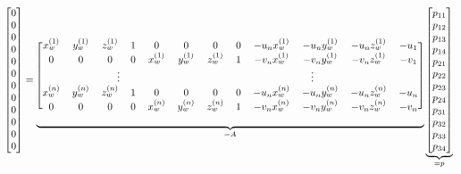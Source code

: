 \setcounter{MaxMatrixCols}{20}
\begin{equation}
    \scalemath{0.9}{
        \begin{bmatrix}
            0 \\ 0 \\ 0 \\ 0 \\ 0 \\ 0 \\ 0 \\ 0 \\ 0 \\ 0 \\ 0 \\ 0
        \end{bmatrix}
        =
        \underbrace{
            \begin{blockarray}{[*{12}c]}
                x_w^{(1)} & y_w^{(1)} & z_w^{(1)} & 1 & 0         & 0         & 0         & 0 & -u_nx_w^{(1)} & -u_ny_w^{(1)} & -u_nz_w^{(1)} & -u_1 \\
                0         & 0         & 0         & 0 & x_w^{(1)} & y_w^{(1)} & z_w^{(1)} & 1 & -v_nx_w^{(1)} & -v_ny_w^{(1)} & -v_nz_w^{(1)} & -v_1 \\
                \BAmulticolumn{6}{c}{\vdots} & \BAmulticolumn{6}{c}{\vdots} \\
                x_w^{(n)} & y_w^{(n)} & z_w^{(n)} & 1 & 0         & 0         & 0         & 0 & -u_nx_w^{(n)} & -u_ny_w^{(n)} & -u_nz_w^{(n)} & -u_n \\
                0         & 0         & 0         & 0 & x_w^{(n)} & y_w^{(n)} & z_w^{(n)} & 1 & -v_nx_w^{(n)} & -v_ny_w^{(n)} & -v_nz_w^{(n)} & -v_n
            \end{blockarray}
        }_{=A}
        \underbrace{
            \begin{bmatrix}
                p_{11} \\ p_{12} \\ p_{13} \\ p_{14} \\ p_{21} \\ p_{22} \\ p_{23} \\ p_{24} \\ p_{31} \\ p_{32} \\ p_{33} \\ p_{34}
            \end{bmatrix}
        }_{=p}
    }
\end{equation}

